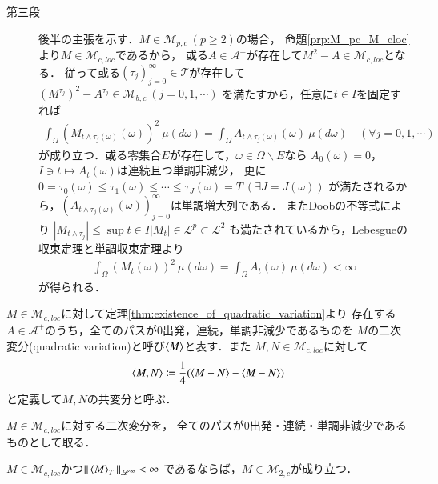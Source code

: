 \begin{prf}
\begin{description}
			\item[第三段]
				後半の主張を示す．$M \in \mathcal{M}_{p,c}\ (p \geq 2)$の場合，
				命題\ref{prp:M_pc_M_cloc}より$M \in \mathcal{M}_{c,loc}$であるから，
				或る$A \in \mathcal{A}^+$が存在して$M^2 - A \in \mathcal{M}_{c,loc}$となる．
				従って或る$(\tau_j)_{j=0}^{\infty} \in \mathcal{T}$が存在して
				$\left(M^{\tau_j} \right)^2 - A^{\tau_j} \in \mathcal{M}_{b,c}\ (j=0,1,\cdots)$
				を満たすから，任意に$t \in I$を固定すれば
				\begin{align}
					\int_{\Omega} \left( M_{t \wedge \tau_j(\omega)}(\omega) \right)^2\ \mu(d\omega)
					= \int_{\Omega} A_{t \wedge \tau_j(\omega)}(\omega)\ \mu(d\omega)
					\quad (\forall j=0,1,\cdots)
				\end{align}
				が成り立つ．或る零集合$E$が存在して，$\omega \in \Omega \backslash E$なら
				$A_0(\omega) = 0$，$I \ni t \longmapsto A_t(\omega)$は連続且つ単調非減少，
				更に$0 = \tau_0(\omega) \leq \tau_1(\omega) \leq \cdots \leq \tau_{J}(\omega) = T\ (\exists J = J(\omega))$
				が満たされるから，$\left(A_{t \wedge \tau_j(\omega)}(\omega)\right)_{j=0}^{\infty}$は単調増大列である．
				またDoobの不等式により
				$\left| M_{t \wedge \tau_j} \right| \leq \sup{t \in I}{|M_t|} \in \mathscr{L}^p \subset \mathscr{L}^2$
				も満たされているから，Lebesgueの収束定理と単調収束定理より
				\begin{align}
					\int_{\Omega} \left( M_t(\omega) \right)^2\ \mu(d\omega)
					= \int_{\Omega} A_t(\omega)\ \mu(d\omega) < \infty
				\end{align}
				が得られる．
		\end{description}
	\end{prf}
	
	\begin{screen}
		\begin{dfn}[二次変分]
			$M \in \mathcal{M}_{c,loc}$に対して定理\ref{thm:existence_of_quadratic_variation}より
			存在する$A \in \mathcal{A}^+$のうち，全てのパスが$0$出発，連続，単調非減少であるものを
			$M$の二次変分(quadratic variation)と呼び$\inprod<M>$と表す．また
			$M,N \in \mathcal{M}_{c,loc}$に対して
			\begin{align}
				\inprod<M,N> \coloneqq \frac{1}{4} (\inprod<M+N> - \inprod<M-N>)
			\end{align}
			と定義して$M,N$の共変分と呼ぶ．
		\end{dfn}
	\end{screen}
	
\newpage
	$M \in \mathcal{M}_{c,loc}$に対する二次変分を，
	全てのパスが$0$出発・連続・単調非減少であるものとして取る．
	\begin{screen}
		\begin{thm}[二次変分が有界な局所マルチンゲールは二乗可積分マルチンゲール]
			$M \in \mathcal{M}_{c,loc}$かつ$\Norm{\inprod<M>_T}{\mathscr{L}^{\infty}} < \infty$
			であるならば，$M \in \mathcal{M}_{2,c}$が成り立つ．
			\label{thm:quadratic_variation_bounded_then_M_2c}
		\end{thm}
	\end{screen}
	
